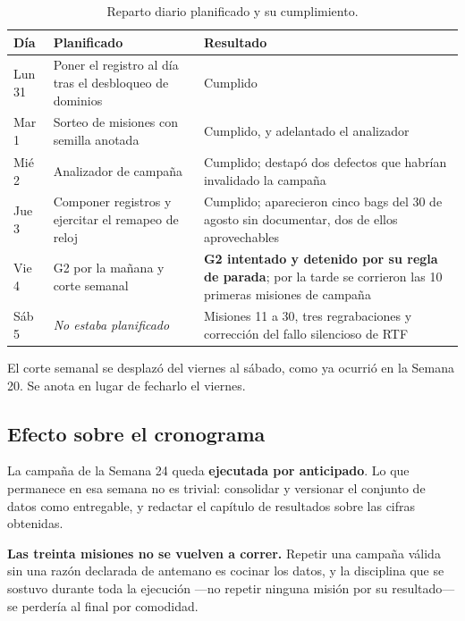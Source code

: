 \documentclass[12pt,letterpaper]{article}
\begin{document}
\begin{table}[H]
    \centering
    \small
    \caption{Reparto diario planificado y su cumplimiento.}
    \label{tab:dias}
    \begin{tabular}{@{}lp{5.6cm}p{5.0cm}@{}}
        \toprule
        \textbf{Día} & \textbf{Planificado} & \textbf{Resultado} \\ \midrule
        Lun 31 & Poner el registro al día tras el desbloqueo de dominios & Cumplido \\ \addlinespace
        Mar 1 & Sorteo de misiones con semilla anotada & Cumplido, y adelantado el analizador \\ \addlinespace
        Mié 2 & Analizador de campaña & Cumplido; destapó dos defectos que habrían invalidado la campaña \\ \addlinespace
        Jue 3 & Componer registros y ejercitar el remapeo de reloj & Cumplido; aparecieron cinco bags del 30 de agosto sin documentar, dos de ellos aprovechables \\ \addlinespace
        Vie 4 & G2 por la mañana y corte semanal & \textbf{G2 intentado y detenido por su regla de parada}; por la tarde se corrieron las 10 primeras misiones de campaña \\ \addlinespace
        Sáb 5 & \emph{No estaba planificado} & Misiones 11 a 30, tres regrabaciones y corrección del fallo silencioso de RTF \\ \bottomrule
    \end{tabular}
\end{table}

El corte semanal se desplazó del viernes al sábado, como ya ocurrió en la Semana 20. Se anota en lugar de fecharlo el viernes.

\subsection{Efecto sobre el cronograma}

La campaña de la Semana 24 queda \textbf{ejecutada por anticipado}. Lo que permanece en esa semana no es trivial: consolidar y versionar el conjunto de datos como entregable, y redactar el capítulo de resultados sobre las cifras obtenidas.

\textbf{Las treinta misiones no se vuelven a correr.} Repetir una campaña válida sin una razón declarada de antemano es cocinar los datos, y la disciplina que se sostuvo durante toda la ejecución ---no repetir ninguna misión por su resultado--- se perdería al final por comodidad.
\end{document}

